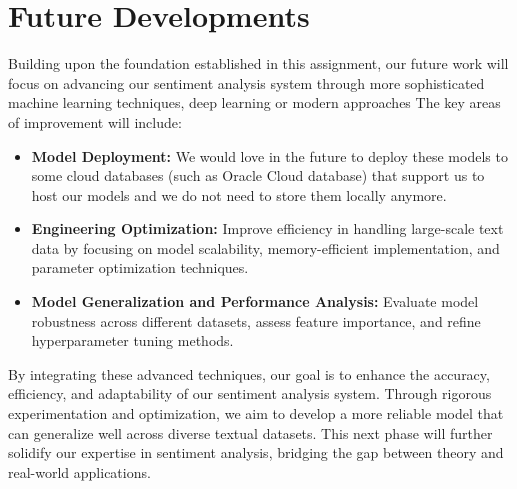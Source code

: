 \section{Future Developments}

Building upon the foundation established in this assignment, our future work will focus on advancing our sentiment analysis system through more sophisticated machine learning techniques, deep learning or modern approaches The key areas of improvement will include:

\begin{itemize}
    \item \textbf{Model Deployment:} We would love in the future to deploy these models to some cloud databases (such as Oracle Cloud database) that support us to host our models and we do not need to store them locally anymore.
    \item \textbf{Engineering Optimization:} Improve efficiency in handling large-scale text data by focusing on model scalability, memory-efficient implementation, and parameter optimization techniques.
    \item \textbf{Model Generalization and Performance Analysis:} Evaluate model robustness across different datasets, assess feature importance, and refine hyperparameter tuning methods.
\end{itemize}

By integrating these advanced techniques, our goal is to enhance the accuracy, efficiency, and adaptability of our sentiment analysis system. Through rigorous experimentation and optimization, we aim to develop a more reliable model that can generalize well across diverse textual datasets. This next phase will further solidify our expertise in sentiment analysis, bridging the gap between theory and real-world applications.

\newpage
